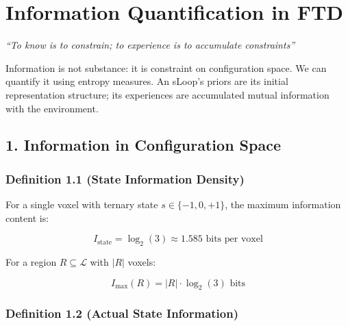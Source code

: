 \documentclass[
  11pt,
  letterpaper,
  twoside,
  openright]{book}
\begin{document}
\chapter{Information Quantification in
FTD}\label{sec-information-quantification}

\emph{``To know is to constrain; to experience is to accumulate
constraints''}

\begin{tcolorbox}[enhanced jigsaw, coltitle=black, colbacktitle=quarto-callout-note-color!10!white, toprule=.15mm, colframe=quarto-callout-note-color-frame, arc=.35mm, opacityback=0, bottomtitle=1mm, toptitle=1mm, breakable, colback=white, titlerule=0mm, opacitybacktitle=0.6, title=\textcolor{quarto-callout-note-color}{\faInfo}\hspace{0.5em}{Key Revelation}, rightrule=.15mm, bottomrule=.15mm, leftrule=.75mm, left=2mm]

Information is not substance: it is constraint on configuration space.
We can quantify it using entropy measures. An sLoop's priors are its
initial representation structure; its experiences are accumulated mutual
information with the environment.

\end{tcolorbox}

\section{1. Information in Configuration
Space}\label{information-in-configuration-space}

\subsection{Definition 1.1 (State Information
Density)}\label{definition-1.1-state-information-density}

For a single voxel with ternary state \(s \in \{-1, 0, +1\}\), the
maximum information content is:

\[I_{\text{state}} = \log_2(3) \approx 1.585 \text{ bits per voxel}\]

For a region \(R \subseteq \mathcal{L}\) with \(|R|\) voxels:

\[I_{\text{max}}(R) = |R| \cdot \log_2(3) \text{ bits}\]

\subsection{Definition 1.2 (Actual State
Information)}\label{definition-1.2-actual-state-information}
\end{document}
